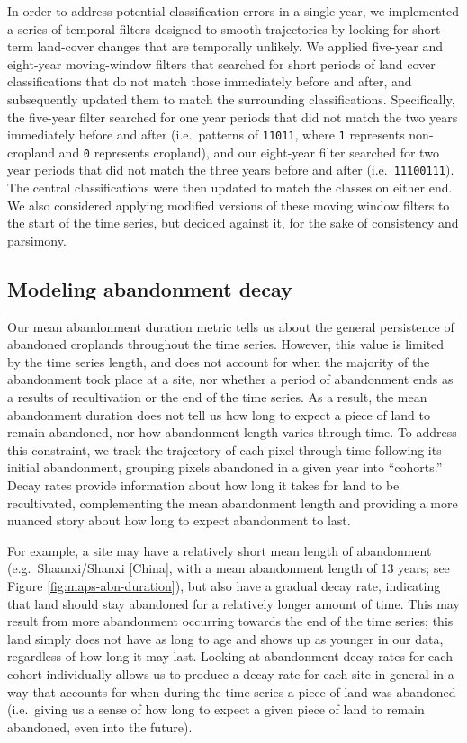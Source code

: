 \documentclass[9pt,twoside,lineno]{pnas-new}
\begin{document}
In order to address potential classification errors in a single year, we implemented a series of temporal filters designed to smooth trajectories by looking for short-term land-cover changes that are temporally unlikely.
We applied five-year and eight-year moving-window filters that searched for short periods of land cover classifications that do not match those immediately before and after, and subsequently updated them to match the surrounding classifications.
Specifically, the five-year filter searched for one year periods that did not match the two years immediately before and after (i.e.~patterns of \texttt{11011}, where \texttt{1} represents non-cropland and \texttt{0} represents cropland), and our eight-year filter searched for two year periods that did not match the three years before and after (i.e.~\texttt{11100111}).
The central classifications were then updated to match the classes on either end.
We also considered applying modified versions of these moving window filters to the start of the time series, but decided against it, for the sake of consistency and parsimony.

\hypertarget{decay-models-si}{%
\subsection{Modeling abandonment decay}\label{decay-models-si}}

Our mean abandonment duration metric tells us about the general persistence of abandoned croplands throughout the time series.
However, this value is limited by the time series length, and does not account for when the majority of the abandonment took place at a site, nor whether a period of abandonment ends as a results of recultivation or the end of the time series.
As a result, the mean abandonment duration does not tell us how long to expect a piece of land to remain abandoned, nor how abandonment length varies through time.
To address this constraint, we track the trajectory of each pixel through time following its initial abandonment, grouping pixels abandoned in a given year into ``cohorts.''
Decay rates provide information about how long it takes for land to be recultivated, complementing the mean abandonment length and providing a more nuanced story about how long to expect abandonment to last.

For example, a site may have a relatively short mean length of abandonment (e.g.~Shaanxi/Shanxi {[}China{]}, with a mean abandonment length of 13 years; see Figure \ref{fig:maps-abn-duration}), but also have a gradual decay rate, indicating that land should stay abandoned for a relatively longer amount of time.
This may result from more abandonment occurring towards the end of the time series; this land simply does not have as long to age and shows up as younger in our data, regardless of how long it may last.
Looking at abandonment decay rates for each cohort individually allows us to produce a decay rate for each site in general in a way that accounts for when during the time series a piece of land was abandoned (i.e.~giving us a sense of how long to expect a given piece of land to remain abandoned, even into the future).
\end{document}

